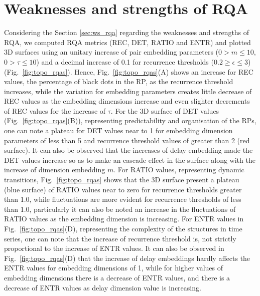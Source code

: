\newpage
\section{Weaknesses and strengths of RQA}
Considering the Section \ref{sec:ws_rqa} regarding 
the weaknesses and strengths of RQA, we computed RQA metrics 
(REC, DET, RATIO and ENTR) and plotted 3D surfaces using an unitary 
increase of pair embedding parameters 
($0 > m \le 10$, $0 > \tau \le 10$) 
and a decimal increase of 0.1 for recurrence thresholds 
($ 0.2 \ge \epsilon \le 3 $) (Fig.~\ref{fig:topo_rqas}). 
Hence, Fig.~\ref{fig:topo_rqas}(A) shows an increase for 
REC values, the percentage of black dots in the RP, 
as the recurrence threshold increases,
while the variation for embedding parameters creates little decrease 
of REC values as the embedding dimensions increase and even slighter 
decrements of REC values for the increase of $\tau$.
For the 3D surface of DET values (Fig.~\ref{fig:topo_rqas}(B)), 
representing 
predictability and organisation of the RPs, one can note a plateau
for DET values near to 1 for embedding dimension parameters of less 
than 5 and recurrence threshold values of greater than 2 (red surface). 
It can also be observed that the increases of delay embedding made 
the DET values increase so as to make an cascade effect in the surface 
along with the increase of dimension embedding $m$.
For RATIO values, representing dynamic transitions, 
Fig.~\ref{fig:topo_rqas} shows that the 3D surface present 
a plateau (blue surface) of RATIO values 
near to zero for recurrence thresholds greater than 1.0, while 
fluctuations are more evident for recurrence thresholds of less than 1.0,
particularly it can also be noted an increase in the fluctuations of 
RATIO values as the embedding dimension is increasing. 
For ENTR values in Fig.~\ref{fig:topo_rqas}(D), 
representing the complexity of the structures in time series, 
one can note that the increase of recurrence threshold is, 
not strictly proportional to the increase of ENTR values. 
It can also be observed in Fig.~\ref{fig:topo_rqas}(D)
that the increase of delay embeddings hardly affects 
the ENTR values for embedding dimensions of 1, while 
for higher values of embedding dimensions 
there is a decrease of ENTR values, and 
there is a decrease of ENTR values as delay dimension value is increasing.
